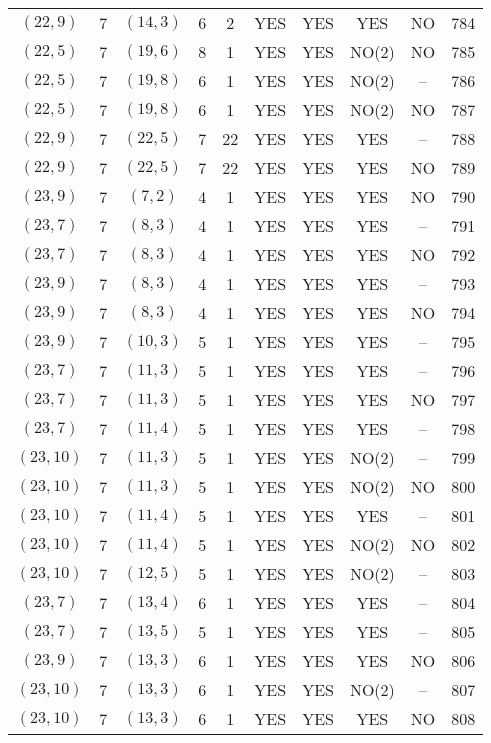 \begin{longtable}{|c|c|c|c|c|c|c|c|c|c|}
$(22, 9)$ & 7 & $(14, 3)$ & 6 & 2 & YES & YES & YES & NO & 784\\
$(22, 5)$ & 7 & $(19, 6)$ & 8 & 1 & YES & YES & NO(2) & NO & 785\\
$(22, 5)$ & 7 & $(19, 8)$ & 6 & 1 & YES & YES & NO(2) & -- & 786\\
$(22, 5)$ & 7 & $(19, 8)$ & 6 & 1 & YES & YES & NO(2) & NO & 787\\
$(22, 9)$ & 7 & $(22, 5)$ & 7 & 22 & YES & YES & YES & -- & 788\\
$(22, 9)$ & 7 & $(22, 5)$ & 7 & 22 & YES & YES & YES & NO & 789\\
$(23, 9)$ & 7 & $(7, 2)$ & 4 & 1 & YES & YES & YES & NO & 790\\
$(23, 7)$ & 7 & $(8, 3)$ & 4 & 1 & YES & YES & YES & -- & 791\\
$(23, 7)$ & 7 & $(8, 3)$ & 4 & 1 & YES & YES & YES & NO & 792\\
$(23, 9)$ & 7 & $(8, 3)$ & 4 & 1 & YES & YES & YES & -- & 793\\
$(23, 9)$ & 7 & $(8, 3)$ & 4 & 1 & YES & YES & YES & NO & 794\\
$(23, 9)$ & 7 & $(10, 3)$ & 5 & 1 & YES & YES & YES & -- & 795\\
$(23, 7)$ & 7 & $(11, 3)$ & 5 & 1 & YES & YES & YES & -- & 796\\
$(23, 7)$ & 7 & $(11, 3)$ & 5 & 1 & YES & YES & YES & NO & 797\\
$(23, 7)$ & 7 & $(11, 4)$ & 5 & 1 & YES & YES & YES & -- & 798\\
$(23, 10)$ & 7 & $(11, 3)$ & 5 & 1 & YES & YES & NO(2) & -- & 799\\
$(23, 10)$ & 7 & $(11, 3)$ & 5 & 1 & YES & YES & NO(2) & NO & 800\\
$(23, 10)$ & 7 & $(11, 4)$ & 5 & 1 & YES & YES & YES & -- & 801\\
$(23, 10)$ & 7 & $(11, 4)$ & 5 & 1 & YES & YES & NO(2) & NO & 802\\
$(23, 10)$ & 7 & $(12, 5)$ & 5 & 1 & YES & YES & NO(2) & -- & 803\\
$(23, 7)$ & 7 & $(13, 4)$ & 6 & 1 & YES & YES & YES & -- & 804\\
$(23, 7)$ & 7 & $(13, 5)$ & 5 & 1 & YES & YES & YES & -- & 805\\
$(23, 9)$ & 7 & $(13, 3)$ & 6 & 1 & YES & YES & YES & NO & 806\\
$(23, 10)$ & 7 & $(13, 3)$ & 6 & 1 & YES & YES & NO(2) & -- & 807\\
$(23, 10)$ & 7 & $(13, 3)$ & 6 & 1 & YES & YES & YES & NO & 808\\

\end{longtable}
